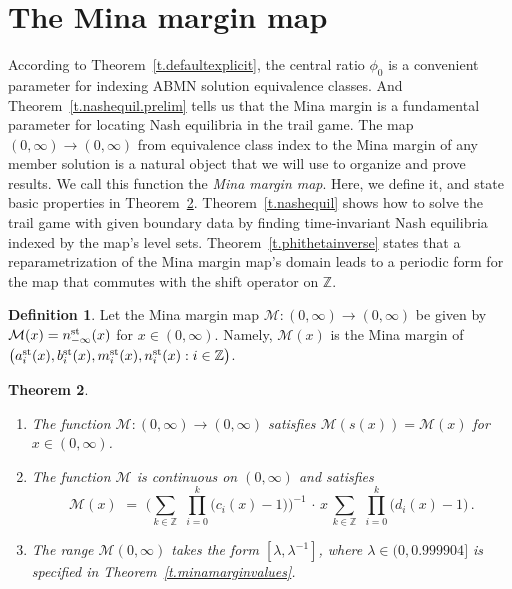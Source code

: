 \documentclass[letterpaper,11pt,oneside,reqno]{amsbook}
\newcommand{\Z}{\ensuremath{\mathbb{Z}}}
\newtheorem{theorem}{Theorem}[chapter]
\numberwithin{figure}{chapter}
\theoremstyle{definition}
\theoremstyle{definition}
\theoremstyle{definition}
\newtheorem{definition}[theorem]{Definition}
\theoremstyle{definition}
\theoremstyle{definition}
\newcommand{\macdee}{d}
\newcommand{\asta}{a^{\rm st}}
\newcommand{\bst}{b^{\rm st}}
\newcommand{\mst}{m^{\rm st}}
\newcommand{\nst}{n^{\rm st}}
\newcommand{\minamm}{\mathcal{M}}
\newcommand{\abmnmacspace}{\textrm{ABMN} }
\def\hfff#1{\label{#1}}
\begin{document}
\section{The Mina margin map}\label{s.mmm}
According to Theorem~\ref{t.defaultexplicit}, the central ratio $\phi_0$ is a convenient parameter for indexing \abmnmacspace solution equivalence classes. And Theorem~\ref{t.nashequil.prelim} tells us that the Mina margin is a fundamental parameter for locating Nash equilibria in the trail game. The map $(0,\infty) \to (0,\infty)$ from equivalence class index to the Mina margin of any member solution is a natural object that we will use to organize and prove results. We call this function the {\em Mina margin map}\hfff{MMM}. Here, we define it, and state basic properties in Theorem~\ref{t.relativereward}. Theorem~\ref{t.nashequil} shows how to solve the trail game with given boundary data by finding time-invariant Nash equilibria indexed by the map's level sets. Theorem~\ref{t.phithetainverse} states that a reparametrization of the Mina margin map's domain leads to a periodic form for the map that commutes with the shift operator on $\Z$.
\begin{definition}\label{d.r}
Let the Mina margin map $\minamm:(0,\infty) \to (0,\infty)$ be given by $\minamm(x) =\nst_{-\infty}(x)$ for  $x \in (0,\infty)$. Namely, $\minamm(x)$ is 
the Mina margin of  $\big(\asta_i(x),\bst_i(x),\mst_i(x),\nst_i(x): i \in \Z \big)$. 
\end{definition}
\begin{theorem}\label{t.relativereward}
\leavevmode
\begin{enumerate}
\item The function $\minamm:(0,\infty) \to (0,\infty)$ satisfies $\minamm(s(x)) = \minamm(x)$ for $x \in (0,\infty)$.
\item The function $\minamm$ is continuous on $(0,\infty)$ and satisfies
$$
 \minamm(x) \, \, = \, \, \Bigg(  \sum_{k \in \Z} \, \, \prod_{i=0}^k \big( c_i(x) - 1 \big)  \Bigg)^{-1} \, \cdot \, x \, \sum_{k \in \Z} \, \, \prod_{i=0}^k \big( \macdee_i(x) - 1 \big) \, .
$$ 
\item The range $\minamm(0,\infty)$ takes the form $[\lambda,\lambda^{-1}]$, where $\lambda \in (0,0.999904]$ is specified in Theorem~\ref{t.minamarginvalues}.
\end{enumerate}
\end{theorem}


\end{document}
